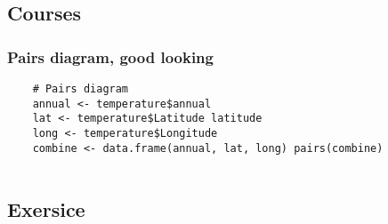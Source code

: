 \subsection{Courses}
\lstset{language=R}

\subsubsection{Pairs diagram, good looking}
\begin{lstlisting}
    # Pairs diagram
    annual <- temperature$annual
    lat <- temperature$Latitude latitude
    long <- temperature$Longitude
    combine <- data.frame(annual, lat, long) pairs(combine)
    
\end{lstlisting}

\subsection{Exersice}

